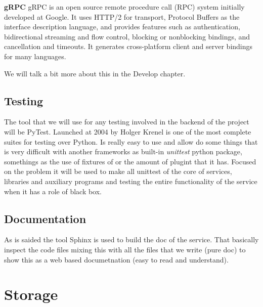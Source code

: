 \noindent \textbf{gRPC}
\intro
gRPC is an open source remote procedure call (RPC) system initially developed at Google. It uses HTTP/2 for transport, Protocol Buffers as the interface description language, and provides features such as authentication, bidirectional streaming and flow control, blocking or nonblocking bindings, and cancellation and timeouts. It generates cross-platform client and server bindings for many languages.

We will talk a bit more about this in the Develop chapter.


\subsection{Testing}

The tool that we will use for any testing involved in the backend of the project
will be PyTest. Launched at 2004 by Holger Krenel is one of the most complete
suites for testing over Python.
Is really easy to use and allow do some things that is very difficult with another
frameworks as built-in \textit{unittest} python package, somethings as the use of
fixtures of or the amount of plugint that it has.
\intro
Focused on the problem it will be used to make all unittest of the core of services,
libraries and auxiliary programs and testing the entire functionality of the service
when it has a role of black box.


\subsection{Documentation}

As is saided the tool Sphinx is used to build the doc of the service.
That basically inspect the code files mixing this with all the files
that we write (pure doc) to show this as a web based documetnation
(easy to read and understand).

\section{Storage}

